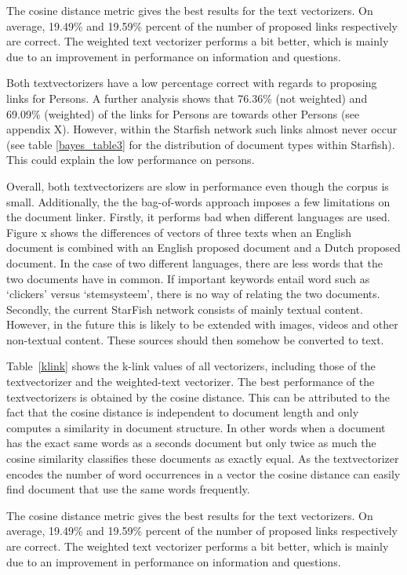 The cosine distance metric gives the best results for the text vectorizers. On average, 19.49\% and 19.59\% percent of the number of proposed links respectively are correct. The weighted text vectorizer performs a bit better, which is mainly due to an improvement in performance on information and questions. %

Both textvectorizers have a low percentage correct with regards to proposing links for Persons. A further analysis shows that 76.36\% (not weighted) and 69.09\% (weighted) of the links for Persons are towards other Persons (see appendix X). However, within the Starfish network such links almost never occur (see table \ref{bayes_table3} for the distribution of document types within Starfish). This could explain the low performance on persons. 

Overall, both textvectorizers are slow in performance even though the corpus is small. Additionally, the the bag-of-words approach imposes a few limitations on the document linker. Firstly, it performs bad when different languages are used. Figure x shows the differences of vectors of three texts when an English document is combined with an English proposed document and a Dutch proposed document. In the case of two different languages, there are less words that the two documents have in common. If important keywords entail word such as `clickers' versus `stemsysteem', there is no way of relating the two documents. Secondly, the current StarFish network consists of mainly textual content. However, in the future this is likely to be extended with images, videos and other non-textual content. These sources should then somehow be converted to text.

Table~\ref{klink} shows the k-link values of all vectorizers, including those
of the textvectorizer and the weighted-text vectorizer. The best performance of
the textvectorizers is obtained by the cosine distance. This can be
attributed to the fact that the cosine distance is independent to document
length and only computes a similarity in document structure. In other words
when a document has the exact same words as a seconds document but only twice
as much the cosine similarity classifies these documents as exactly equal. As
the textvectorizer encodes the number of word occurrences in a vector the
cosine distance can  easily find document that use the same words frequently.

The cosine distance metric gives the best results for the text vectorizers. On
average, 19.49\% and 19.59\% percent of the number of proposed links
respectively are correct. The weighted text vectorizer performs a bit better,
which is mainly due to an improvement in performance on information and
questions. %

